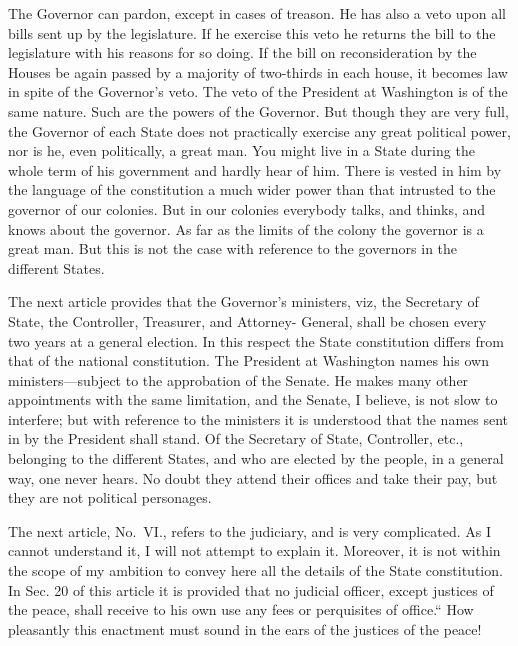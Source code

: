 The Governor can pardon, except in cases of treason.  He has also a
veto upon all bills sent up by the legislature.  If he exercise
this veto he returns the bill to the legislature with his reasons
for so doing.  If the bill on reconsideration by the Houses be
again passed by a majority of two-thirds in each house, it becomes
law in spite of the Governor's veto.  The veto of the President at
Washington is of the same nature.  Such are the powers of the
Governor.  But though they are very full, the Governor of each
State does not practically exercise any great political power, nor
is he, even politically, a great man.  You might live in a State
during the whole term of his government and hardly hear of him.
There is vested in him by the language of the constitution a much
wider power than that intrusted to the governor of our colonies.
But in our colonies everybody talks, and thinks, and knows about
the governor.  As far as the limits of the colony the governor is a
great man.  But this is not the case with reference to the
governors in the different States.

The next article provides that the Governor's ministers, viz, the
Secretary of State, the Controller, Treasurer, and Attorney-
General, shall be chosen every two years at a general election.  In
this respect the State constitution differs from that of the
national constitution.  The President at Washington names his own
ministers---subject to the approbation of the Senate.  He makes many
other appointments with the same limitation, and the Senate, I
believe, is not slow to interfere; but with reference to the
ministers it is understood that the names sent in by the President
shall stand.  Of the Secretary of State, Controller, etc.,
belonging to the different States, and who are elected by the
people, in a general way, one never hears.  No doubt they attend
their offices and take their pay, but they are not political
personages.

The next article, No.\ VI., refers to the judiciary, and is very
complicated.  As I cannot understand it, I will not attempt to
explain it.  Moreover, it is not within the scope of my ambition to
convey here all the details of the State constitution.  In Sec. 20
of this article it is provided that no judicial officer, except
justices of the peace, shall receive to his own use any fees or
perquisites of office.``  How pleasantly this enactment must sound
in the ears of the justices of the peace!


